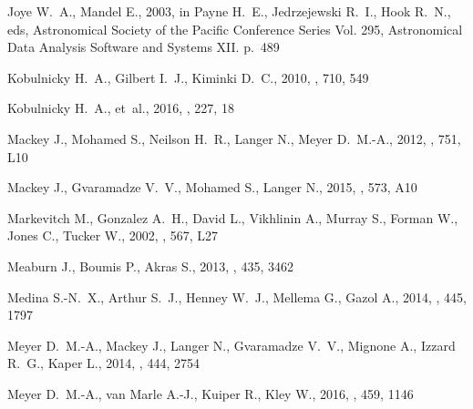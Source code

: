 \documentclass[useAMS, usenatbib, a4paper]{mnras}
\begin{document}
\begin{thebibliography}{}
{Joye} W.~A.,  {Mandel} E.,  2003, in {Payne} H.~E.,  {Jedrzejewski} R.~I.,
  {Hook} R.~N.,  eds,  Astronomical Society of the Pacific Conference Series
  Vol. 295, Astronomical Data Analysis Software and Systems XII. p.~489

{Kobulnicky} H.~A.,  {Gilbert} I.~J.,   {Kiminki} D.~C.,  2010, \apj, 710, 549

{Kobulnicky} H.~A.,  et~al., 2016, \apjs, 227, 18

{Mackey} J.,  {Mohamed} S.,  {Neilson} H.~R.,  {Langer} N.,   {Meyer} D.~M.-A.,
   2012, \apjl, 751, L10

{Mackey} J.,  {Gvaramadze} V.~V.,  {Mohamed} S.,   {Langer} N.,  2015, \aap,
  573, A10

{Markevitch} M.,  {Gonzalez} A.~H.,  {David} L.,  {Vikhlinin} A.,  {Murray} S.,
   {Forman} W.,  {Jones} C.,   {Tucker} W.,  2002, \apjl, 567, L27

{Meaburn} J.,  {Boumis} P.,   {Akras} S.,  2013, \mnras, 435, 3462

{Medina} S.-N.~X.,  {Arthur} S.~J.,  {Henney} W.~J.,  {Mellema} G.,   {Gazol}
  A.,  2014, \mnras, 445, 1797

{Meyer} D.~M.-A.,  {Mackey} J.,  {Langer} N.,  {Gvaramadze} V.~V.,  {Mignone}
  A.,  {Izzard} R.~G.,   {Kaper} L.,  2014, \mnras, 444, 2754

{Meyer} D.~M.-A.,  {van Marle} A.-J.,  {Kuiper} R.,   {Kley} W.,  2016, \mnras,
  459, 1146


\end{thebibliography}
\end{document}
